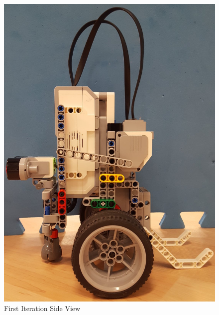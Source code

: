 \documentclass[11pt]{article}
\begin{document}
\begin{figure}[!tbp]
\begin{minipage}[b]{0.4\textwidth}
\includegraphics[scale=0.18]{images/Hardware_Mechanical/First_Iteration_Left.jpg}
\caption{First Iteration Side View}\label{Side View}
  \end{minipage}
\end{figure}
\newpage
\end{document}
